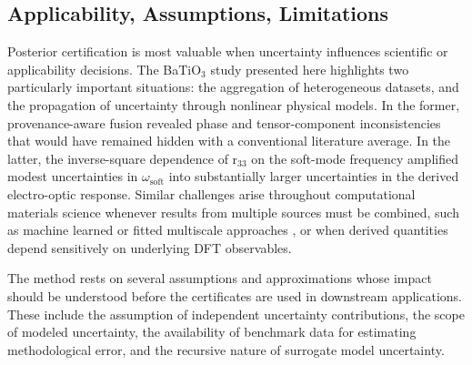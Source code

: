 \documentclass[twocolumn,superscriptaddress,amsmath,amssymb,longbibliography]{revtex4-2}
\begin{document}
\subsection{Applicability, Assumptions, Limitations}

Posterior certification is most valuable when uncertainty influences scientific or applicability decisions. The BaTiO$_3$ study presented here highlights two particularly important situations: the aggregation of heterogeneous datasets, and the propagation of uncertainty through nonlinear physical models.  In the former, provenance-aware fusion revealed phase and tensor-component inconsistencies that would have remained hidden with a conventional literature average. In the latter, the inverse-square dependence of r$_{33}$ on the soft-mode frequency amplified modest uncertainties in  $\omega_{\text{soft}}$ into substantially larger uncertainties in the derived electro-optic response. Similar challenges arise throughout computational materials science whenever results from multiple sources must be combined, such as machine learned or fitted multiscale approaches \cite{Henderson2023}, or when derived quantities depend sensitively on underlying DFT observables.




The method rests on several assumptions and approximations whose impact should be
understood before the certificates are used in downstream applications.
These include the assumption of independent uncertainty contributions, the scope of modeled
uncertainty, the availability of benchmark data for estimating methodological error, and the recursive nature
of surrogate model uncertainty.
\end{document}
